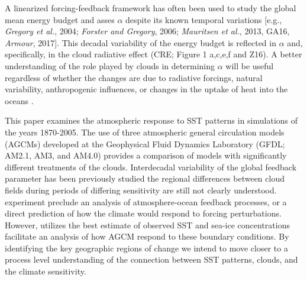 {A linearized forcing-feedback framework has often been used to study the global mean energy budget and asses $\alpha$ despite its known temporal variations %
[e.g., \textit{Gregory et al.}, 2004; \textit{Forster and Gregory}, 2006; \textit{Mauritsen et al.}, 2013, GA16, \textit{Armour}, 2017].
This decadal variability of the energy budget is reflected in $\alpha$ and, specifically, in the cloud radiative effect (CRE; Figure 1 a,c,e,f and Z16).}   A better understanding of the role played by clouds in determining $\alpha$ will be useful regardless of whether the changes are due to radiative forcings, natural variability, anthropogenic influences, or changes in the uptake of heat into the oceans \citep{Haugstad_etal_2017}.  

This paper examines the atmospheric response to  SST patterns in simulations of the years 1870-2005.  The use of three atmospheric general circulation models (AGCMs) developed at the Geophysical Fluid Dynamics Laboratory (GFDL;  AM2.1, AM3, and AM4.0) provides a comparison of models with significantly different treatments of the clouds.  
Interdecadal variability of the global feedback parameter has been previously studied  the regional differences between cloud fields during periods of differing sensitivity are still not clearly understood.
 experiment preclude an analysis of atmosphere-ocean feedback processes, or a direct prediction of how the climate would respond to forcing perturbations.  
However,  utilizes the best estimate of observed SST and sea-ice concentrations  facilitate an analysis of how  AGCM respond to these boundary conditions.
By identifying the  key geographic regions of change we intend to move closer to a process level understanding of the connection between SST patterns, clouds, and the climate sensitivity.

